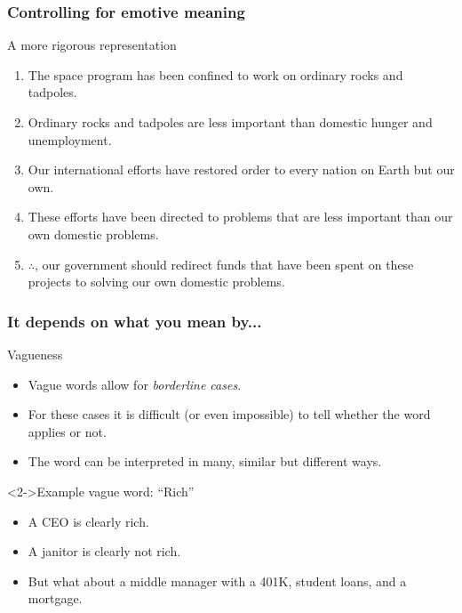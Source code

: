 \documentclass[10pt,letterpaper,xcolor=dvipsnames,handout]{beamer}
\begin{document}
\begin{frame}
\frametitle{Controlling for emotive meaning}

\begin{block}{A more rigorous representation}

  \begin{enumerate}
    \item The space program has been confined to work on ordinary rocks and tadpoles.
    \item Ordinary rocks and tadpoles are less important than domestic hunger and unemployment.
    \item Our international efforts have restored order to every nation on Earth but our own.
    \item These efforts have been directed to problems that are less important than our own domestic problems.
    \item $\therefore$, our government should redirect funds that have been spent on these projects to solving our own domestic problems.
  \end{enumerate}
  
\end{block}


\end{frame}

\begin{frame}
\frametitle{It depends on what you mean by...}

\begin{block}{Vagueness}
\begin{itemize}
  \item Vague words allow for \textit{borderline cases}.
  \item For these cases it is difficult (or even impossible) to tell whether the word applies or not.
  \item The word can be interpreted in many, similar but different ways.
\end{itemize}
\end{block}

\begin{block}<2->{Example vague word: ``Rich''}
  \begin{itemize}
    \item A CEO is clearly rich.
    \item A janitor is clearly not rich.
    \item But what about a middle manager with a 401K, student loans, and a mortgage.
  \end{itemize}
\end{block}

\end{frame}
\end{document}
